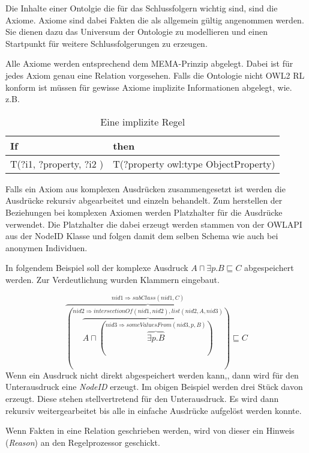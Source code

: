 Die Inhalte einer Ontolgie die für das Schlussfolgern wichtig sind, sind die Axiome. Axiome sind dabei Fakten die als allgemein gültig angenommen werden. Sie dienen dazu das Universum der Ontologie zu modellieren und einen Startpunkt für weitere Schlussfolgerungen zu erzeugen.

Alle Axiome werden entsprechend dem MEMA-Prinzip abgelegt. Dabei ist für jedes Axiom genau eine Relation vorgesehen. Falls die Ontologie nicht OWL2 RL konform ist müssen für gewisse Axiome implizite Informationen abgelegt, wie. z.B.

\begin{table}
	\caption{Eine implizite Regel}
	\label{rule-impl}
\begin{center}
	\begin{tabular}{l|l}
    If & then \\ \hline
	T(?i1, ?property, ?i2 ) & T(?property owl:type ObjectProperty) \\
   \end{tabular}
\end{center}
\end{table}


Falls ein Axiom aus komplexen Ausdrücken zusammengesetzt ist werden die Ausdrücke rekursiv abgearbeitet und einzeln behandelt. Zum herstellen der Beziehungen bei komplexen Axiomen werden Platzhalter für die Ausdrücke verwendet. Die Platzhalter die dabei erzeugt werden stammen von der OWLAPI aus der NodeID Klasse und folgen damit dem selben Schema wie auch bei anonymen Individuen.

In folgendem Beispiel soll der komplexe Ausdruck $A \sqcap \exists p.B \sqsubseteq C$ abgespeichert werden. Zur Verdeutlichung wurden Klammern eingebaut.

\begin{equation}
\overbrace{
	(\overbrace{A \sqcap (
		\overbrace{\exists{}p.B}
		^{nid3 \Rightarrow someValuesFrom(nid3, p, B)})}
	^{nid2 \Rightarrow intersectionOf(nid1, nid2), list(nid2, A, nid3)})}
^{nid1 \Rightarrow subClass(nid1, C)} \sqsubseteq C
\end{equation}
Wenn ein Ausdruck nicht direkt abgespeichert werden kann,, dann wird für den Unterausdruck eine \emph{NodeID} erzeugt. Im obigen Beispiel werden drei Stück davon erzeugt. Diese stehen stellvertretend für den Unterausdruck. Es wird dann rekursiv weitergearbeitet bis alle in einfache Ausdrücke aufgelöst werden konnte.

Wenn Fakten in eine Relation geschrieben werden, wird von dieser ein Hinweis (\emph{Reason}) an den Regelprozessor geschickt.

